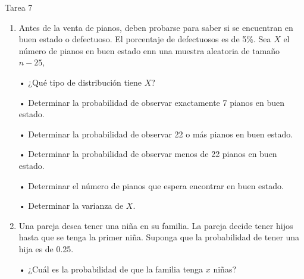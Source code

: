 \documentclass[a4paper, 12pt]{article}
\newcommand{\Pspace}{0.5cm}
\newcommand{\Aspace}{0.2cm}
\begin{document}
\newpage
\begin{center}
    { \LARGE Tarea 7}
\end{center}

\begin{enumerate}
    \item Antes de la venta de pianos, deben probarse para saber si se encuentran en buen estado o defectuoso. El porcentaje de defectuosos es de 5\%. Sea $X$ el número de pianos en buen estado enn una muestra aleatoria de tamaño $n - 25$,
    \vspace{\Aspace} \par
    • ¿Qué tipo de distribución tiene $X$?
    \\ { \color{azul}  }

    \vspace{\Aspace} \par
    • Determinar la probabilidad de observar exactamente 7 pianos en buen estado.
    \\ { \color{azul}  }

    \vspace{\Aspace} \par
    • Determinar la probabilidad de observar 22 o más pianos en buen estado.
    \\ { \color{azul}  }

    \vspace{\Aspace} \par
    • Determinar la probabilidad de observar menos de 22 pianos en buen estado.
    \\ { \color{azul}  }

    \vspace{\Aspace} \par
    • Determinar el número de pianos que espera encontrar en buen estado.
    \\ { \color{azul}  }

    \vspace{\Aspace} \par
    • Determinar la varianza de $X$.
    \\ { \color{azul}  }


    \vspace{\Pspace}
    \item Una pareja desea tener una niña en su familia. La pareja decide tener hijos hasta que se tenga la primer niña. Suponga que la probabilidad de tener una hija es de 0.25. 
    \vspace{\Aspace} \par
    • ¿Cuál es la probabilidad de que la familia tenga $x$ niñas?
    \\ { \color{azul}  }


\end{enumerate}
\end{document}
